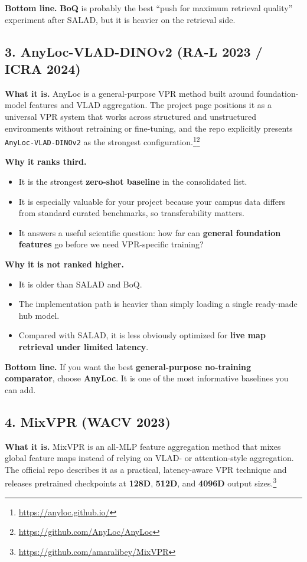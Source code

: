 \documentclass[11pt]{article}
\begin{document}
\textbf{Bottom line.} \textbf{BoQ} is probably the best ``push for maximum retrieval quality'' experiment after SALAD, but it is heavier on the retrieval side.

\subsection*{3. AnyLoc-VLAD-DINOv2 (RA-L 2023 / ICRA 2024)}
\textbf{What it is.} AnyLoc is a general-purpose VPR method built around foundation-model features and VLAD aggregation. The project page positions it as a universal VPR system that works across structured and unstructured environments without retraining or fine-tuning, and the repo explicitly presents \texttt{AnyLoc-VLAD-DINOv2} as the strongest configuration.\footnote{\url{https://anyloc.github.io/}}\footnote{\url{https://github.com/AnyLoc/AnyLoc}}

\textbf{Why it ranks third.}
\begin{itemize}[leftmargin=*]
  \item It is the strongest \textbf{zero-shot baseline} in the consolidated list.
  \item It is especially valuable for your project because your campus data differs from standard curated benchmarks, so transferability matters.
  \item It answers a useful scientific question: how far can \textbf{general foundation features} go before we need VPR-specific training?
\end{itemize}

\textbf{Why it is not ranked higher.}
\begin{itemize}[leftmargin=*]
  \item It is older than SALAD and BoQ.
  \item The implementation path is heavier than simply loading a single ready-made hub model.
  \item Compared with SALAD, it is less obviously optimized for \textbf{live map retrieval under limited latency}.
\end{itemize}

\textbf{Bottom line.} If you want the best \textbf{general-purpose no-training comparator}, choose \textbf{AnyLoc}. It is one of the most informative baselines you can add.

\subsection*{4. MixVPR (WACV 2023)}
\textbf{What it is.} MixVPR is an all-MLP feature aggregation method that mixes global feature maps instead of relying on VLAD- or attention-style aggregation. The official repo describes it as a practical, latency-aware VPR technique and releases pretrained checkpoints at \textbf{128D}, \textbf{512D}, and \textbf{4096D} output sizes.\footnote{\url{https://github.com/amaralibey/MixVPR}}
\end{document}
